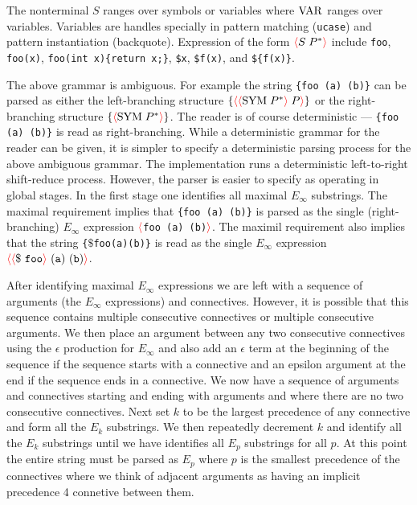 \documentclass{article}
\newcommand{\fopen}{{\color{red} \langle}}
\newcommand{\fclose}{{\color{red} \rangle}}
\begin{document}
The nonterminal $S$ ranges over symbols or variables where $\mathrm{VAR}$ ranges over variables.  Variables are handles specially in pattern matching ({\tt ucase}) and pattern instantiation (backquote).
Expression of the form $\fopen S\;P^*\fclose$ include {\tt foo}, {\tt foo(x)}, {\tt foo(int x)\{return x;\}},
{\tt \$x}, {\tt \$f(x)}, and {\tt \$\{f(x)\}}.


The above grammar is ambiguous.  For example the string {\tt \{foo (a) (b)\}} can be parsed as either the left-branching structure $\{\fopen\fopen\sym\;P^*\fclose\;P\fclose\}$
or the  right-branching structure $\{\fopen\sym\;P^*\fclose\}$.
The reader is of course deterministic --- {\tt \{foo (a) (b)\}} is read as right-branching.  While a deterministic grammar for the reader can be given, it is simpler
to specify a deterministic parsing process for the above ambiguous grammar.
The implementation runs a deterministic left-to-right shift-reduce process.
However, the parser is easier to specify as operating in global stages.  In the first stage one identifies all maximal $E_\infty$ substrings.
The maximal requirement implies that {\tt \{foo (a) (b)\}} is parsed as the single (right-branching)
$E_\infty$ expression $\fopen${\tt foo (a) (b)}$\fclose$. The maximil requirement also implies that the string {\tt \{$\$$\;foo\;(a)\;(b)\}} is read as the single $E_\infty$
expression $\fopen \fopen \mathtt{\$~foo}\fclose\ \mathtt{(a)~(b)} \fclose$.

After identifying maximal $E_\infty$ expressions we are left with a sequence of arguments (the $E_\infty$ expressions) and connectives.
However, it is possible that this sequence contains multiple consecutive connectives or multiple consecutive arguments.  We then place an argument between any two consecutive
connectives using the $\epsilon$ production for $E_\infty$ and also add an $\epsilon$ term at the beginning of the sequence if the sequence starts with a connective and an
epsilon argument at the end if the sequence ends in a connective.  We now have a sequence of arguments and connectives starting and ending with arguments and where there
are no two consecutive connectives.  Next set $k$ to be the largest precedence of any connective and form all the $E_k$ substrings. We then repeatedly decrement $k$ and identify all the $E_k$ substrings
until we have identifies all $E_p$ substrings for all $p$.  At this point the entire string must be parsed as $E_p$ where $p$ is the smallest precedence of the connectives
where we think of adjacent arguments as having an implicit precedence 4 connetive between them.
\end{document}
